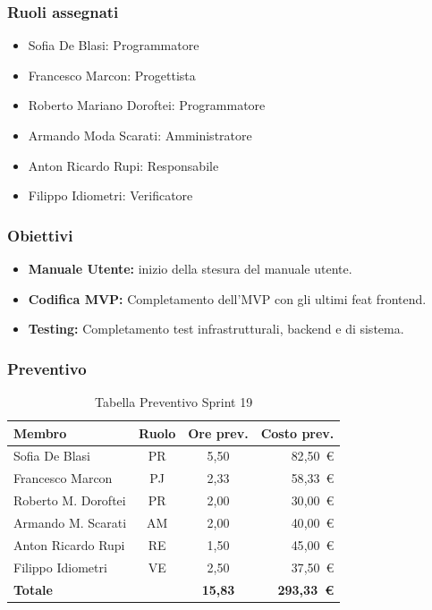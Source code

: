 \subsubsection{Ruoli assegnati}
\begin{itemize}
    \item Sofia De Blasi: Programmatore
    \item Francesco Marcon: Progettista
    \item Roberto Mariano Doroftei: Programmatore
    \item Armando Moda Scarati: Amministratore
    \item Anton Ricardo Rupi: Responsabile
    \item Filippo Idiometri: Verificatore
\end{itemize}

\subsubsection{Obiettivi}
\begin{itemize}
    \item \textbf{Manuale Utente:} inizio della stesura del manuale utente.
    \item \textbf{Codifica MVP:} Completamento dell'MVP con gli ultimi feat frontend.
    \item \textbf{Testing:} Completamento test infrastrutturali, backend e di sistema.
\end{itemize}

\subsubsection{Preventivo}
\begin{table}[H]
    \centering
    \renewcommand{\arraystretch}{1.3}
    \begin{tabularx}{\textwidth}{|X|c|c|r|}
        \hline
        \textbf{Membro} & \textbf{Ruolo} & \textbf{Ore prev.} & \textbf{Costo prev.} \\
        \hline
        Sofia De Blasi       & PR & 5,50 & 82{,}50~\euro \\
        Francesco Marcon     & PJ & 2,33 & 58{,}33~\euro \\
        Roberto M. Doroftei  & PR & 2,00 & 30{,}00~\euro \\
        Armando M. Scarati   & AM & 2,00 & 40{,}00~\euro \\
        Anton Ricardo Rupi   & RE & 1,50 & 45{,}00~\euro \\
        Filippo Idiometri    & VE & 2,50 & 37{,}50~\euro \\
        \hline
        \textbf{Totale}      &    & \textbf{15,83} & \textbf{293{,}33~\euro} \\
        \hline
    \end{tabularx}
    \caption{Tabella Preventivo Sprint 19} 
\end{table}


